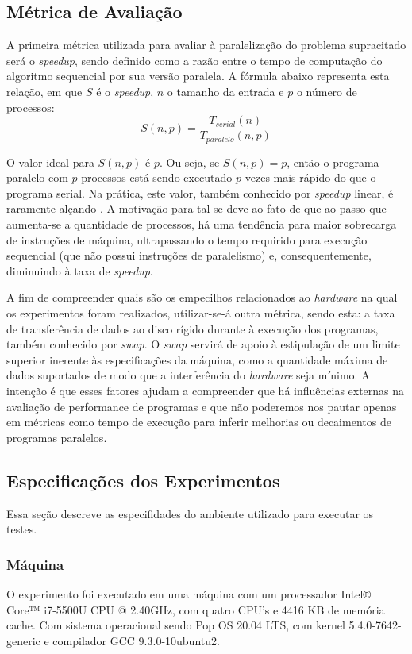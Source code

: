 \documentclass[letterpaper, 10 pt, conference]{ieeeconf}  %
\begin{document}
\subsection{Métrica de Avaliação}
A primeira métrica utilizada para avaliar à paralelização do problema supracitado será o \textit{speedup}, sendo definido como a razão entre o tempo de computação do algoritmo sequencial por sua versão paralela. A fórmula abaixo representa esta relação, em que $S$ é o \textit{speedup}, $n$ o tamanho da entrada e $p$ o número de processos:
$$ S(n,p) = \frac{T_{serial} (n)}{T_{paralelo} (n,p)}$$

O valor ideal para $S(n, p)$ é $p$. Ou seja, se $S(n, p) = p$, então o programa paralelo com $p$ processos está sendo executado $p$ vezes mais rápido do que o programa serial. Na prática, este valor, também conhecido por \textit{speedup} linear, é raramente alçando \cite{c1}. A motivação para tal se deve ao fato de que ao passo que aumenta-se a quantidade de processos, há uma tendência para maior sobrecarga de instruções de máquina, ultrapassando o tempo requirido para execução sequencial (que não possui instruções de paralelismo) e, consequentemente, diminuindo à taxa de \textit{speedup}.

A fim de compreender quais são os empecilhos relacionados ao \textit{hardware} na qual os experimentos foram realizados, utilizar-se-á outra métrica, sendo esta: a taxa de transferência de dados ao disco rígido durante à execução dos programas, também conhecido por \textit{swap}. O \textit{swap} servirá de apoio à estipulação de um limite superior inerente às especificações da máquina, como a quantidade máxima de dados suportados de modo que a interferência do \textit{hardware} seja mínimo. A intenção é que esses fatores ajudam a compreender que há influências externas na avaliação de performance de programas e que não poderemos nos pautar apenas em métricas como tempo de execução para inferir melhorias ou decaimentos de programas paralelos.

\subsection{Especificações dos Experimentos}
Essa seção descreve as especifidades do ambiente utilizado para executar os testes.

\subsubsection{Máquina}
O experimento foi executado em uma máquina com um processador Intel® Core™ i7-5500U CPU @ 2.40GHz, com quatro CPU's e 4416 KB de memória cache. Com sistema operacional sendo Pop OS 20.04 LTS, com kernel 5.4.0-7642-generic e compilador GCC 9.3.0-10ubuntu2.
\end{document}

